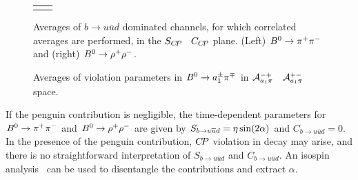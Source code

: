 \begin{figure}[htb]
\begin{center}
\begin{tabular}{cc}
{      }
    \end{tabular}
  \end{center}
  \vspace{-0.8cm}
  \caption{
    Averages of $b \to u\bar u d$ dominated channels,
    for which correlated averages are performed,
    in the $S_{C\!P}$ \vs\ $C_{C\!P}$ plane.
    (Left) $B^0 \to \pi^+\pi^-$ and (right) $B^0 \to \rho^+\rho^-$.
  }
  \label{fig:cp_uta:uud_SvsC}
\end{figure}

\begin{figure}[htb]
  \begin{center}
    \vspace{-0.3cm}
    \caption{
      Averages of \CP violation parameters in $B^0 \to a_1^\pm\pi^\mp$ in
      ${\cal A}^{-+}_{a_1\pi}$ \vs\ ${\cal A}^{+-}_{a_1\pi}$ space.
    }
    \label{fig:cp_uta:a1pi}
  \end{center}
\end{figure}

If the penguin contribution is negligible, 
the time-dependent parameters for $B^0 \to \pi^+\pi^-$ 
and $B^0 \to \rho^+\rho^-$ are given by
$S_{b \to u\bar u d} = \etacp \sin(2\alpha)$ and
$C_{b \to u\bar u d} = 0$.
In the presence of the penguin contribution, 
$C\!P$ violation in decay may arise, 
and there is no straightforward interpretation 
of $S_{b \to u\bar u d}$ and $C_{b \to u\bar u d}$.
An isospin analysis~\cite{Gronau:1990ka} 
can be used to disentangle the contributions and extract $\alpha$.

